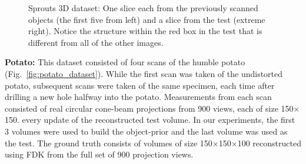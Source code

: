 \documentclass[journal]{IEEEtran}
\begin{document}
\begin{figure}[!h]
\begin{subfigure}[b]{0.29\linewidth}
\captionsetup{labelformat=empty}
        \caption{}
     \end{subfigure}
      \caption{Sprouts 3D dataset: One slice each from the previously scanned objects (the first five from left) and a slice from the test (extreme
        right). Notice the structure within the red box in the test that is different from all of the other images.}
\label{fig:object-prior_test_sprouts}
\addtolength{\textfloatsep}{-0.8cm}
\end{figure}


\textbf{Potato:} This dataset consisted of four scans of the humble
potato (Fig.~\ref{fig:potato_dataset}). While the first
scan was taken of the undistorted potato, subsequent scans were taken
of the same specimen, each time after drilling a new hole halfway into
the potato. Measurements from each scan consisted of real circular
cone-beam projections from 900 views, each of size
150$\times$150. %
every update of the reconstructed test volume.  In our experiments,
the first 3 volumes were used to build the object-prior and the last
volume was used as the test. The ground truth consists of volumes of
size 150$\times$150$\times$100 reconstructed using FDK from the full
set of 900 projection views.
\end{document}
